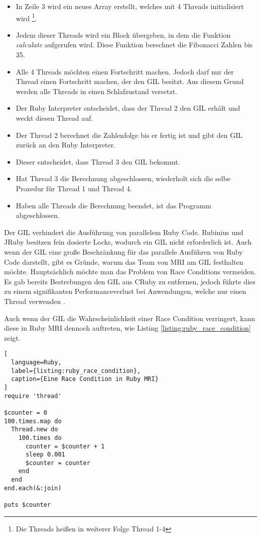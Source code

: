 \begin{itemize}
  \item In Zeile 3 wird ein neues Array erstellt, welches mit 4 Threads initialisiert wird \footnote{Die Threads heißen in weiterer Folge Thread 1-4}.
  \item Jedem dieser Threads wird ein Block übergeben, in dem die Funktion \emph{calculate} aufgerufen wird. Diese Funktion berechnet die Fibonacci Zahlen bis 35.
  \item Alle 4 Threads möchten einen Fortschritt machen. Jedoch darf nur der Thread einen Fortschritt machen, der den GIL besitzt. Aus diesem Grund werden alle Threads in einen Schlafzustand versetzt.
  \item Der Ruby Interpreter entscheidet, dass der Thread 2 den GIL erhält und weckt diesen Thread auf.
  \item Der Thread 2 berechnet die Zahlenfolge bis er fertig ist und gibt den GIL zurück an den Ruby Interpreter.
  \item Dieser entscheidet, dass Thread 3 den GIL bekommt.
  \item Hat Thread 3 die Berechnung abgeschlossen, wiederholt sich die selbe Prozedur für Thread 1 und Thread 4.
  \item Haben alle Threads die Berechnung beendet, ist das Programm abgeschlossen.
\end{itemize}

Der GIL verhindert die Ausführung von parallelem Ruby Code. Rubinius und JRuby besitzen fein dosierte Locks, wodurch ein GIL nicht erforderlich ist. Auch wenn der GIL eine große Beschränkung für das parallele Ausführen von Ruby Code darstellt, gibt es Gründe, warum das Team von MRI am GIL festhalten möchte. Hauptsächlich möchte man das Problem von Race Conditions vermeiden. Es gab bereits Bestrebungen den GIL aus CRuby zu entfernen, jedoch führte dies zu einem signifikanten Performanceverlust bei Anwendungen, welche nur einen Thread verwenden \cite[p. 48-49]{Sto2013}.

Auch wenn der GIL die Wahrscheinlichkeit einer Race Condition verringert, kann diese in Ruby MRI dennoch auftreten, wie Listing \ref{listing:ruby_race_condition} zeigt.

\begin{lstlisting}[
  language=Ruby,
  label={listing:ruby_race_condition},
  caption={Eine Race Condition in Ruby MRI}
]
require 'thread'

$counter = 0
100.times.map do
  Thread.new do
    100.times do
      counter = $counter + 1
      sleep 0.001
      $counter = counter
    end
  end
end.each(&:join)

puts $counter
\end{lstlisting}

